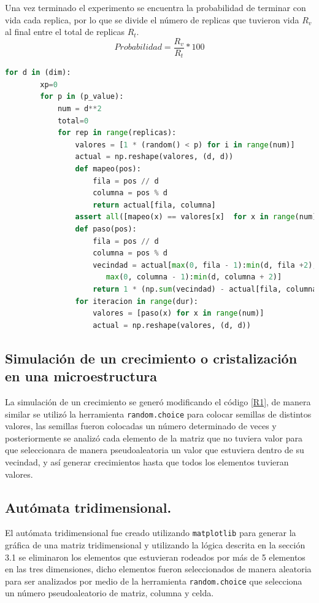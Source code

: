 \documentclass{article}
\begin{document}
Una vez terminado el experimento se encuentra la probabilidad de terminar con vida cada replica, por lo que se divide el número de replicas que tuvieron vida $R_v$al final entre el total de replicas $R_t$.
\begin{equation}
    Probabilidad=\frac{R_v}{R_t}*100
\end{equation}
\lstset{basicstyle=\ttfamily, keywordstyle=\bfseries}
\begin{lstlisting}[frame=single,language=Python,caption=Programación de un autómata celular variando el valor de $p$ y $num$\label{R1}]
  for d in (dim):
        xp=0
        for p in (p_value):
            num = d**2
            total=0
            for rep in range(replicas):
                valores = [1 * (random() < p) for i in range(num)]
                actual = np.reshape(valores, (d, d))
                def mapeo(pos):  
                    fila = pos // d
                    columna = pos % d
                    return actual[fila, columna]
                assert all([mapeo(x) == valores[x]  for x in range(num)])
                def paso(pos):
                    fila = pos // d
                    columna = pos % d
                    vecindad = actual[max(0, fila - 1):min(d, fila +2),
                       max(0, columna - 1):min(d, columna + 2)]
                    return 1 * (np.sum(vecindad) - actual[fila, columna] == 3)
                for iteracion in range(dur):
                    valores = [paso(x) for x in range(num)]
                    actual = np.reshape(valores, (d, d))
\end{lstlisting}  
\subsection{Simulación de un crecimiento o cristalización en una microestructura}
La simulación de un crecimiento se generó modificando el código \ref{R1}, de manera similar se utilizó la herramienta \texttt{random.choice} para colocar semillas de distintos valores, las semillas fueron colocadas un número determinado de veces y posteriormente se analizó cada elemento de la matriz que no tuviera valor para que seleccionara de manera pseudoaleatoria un valor que estuviera dentro de su vecindad, y así generar crecimientos hasta que todos los elementos tuvieran valores.
\subsection{Autómata tridimensional.}
El autómata tridimensional fue creado utilizando \texttt{matplotlib} para generar la gráfica de una matriz tridimensional y utilizando la lógica descrita en la sección 3.1 se eliminaron los elementos que estuvieran rodeados por más de 5 elementos en las tres dimensiones, dicho elementos fueron seleccionados de manera aleatoria para ser analizados por medio de la herramienta \texttt{random.choice} que selecciona un número pseudoaleatorio de matriz, columna y celda.
\end{document}
